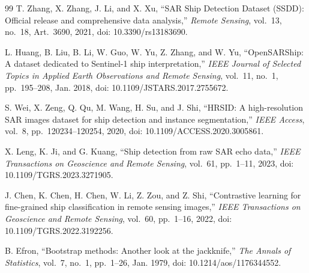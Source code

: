 \documentclass[journal]{IEEEtran}
\begin{document}
\begin{thebibliography}{99}
T. Zhang, X. Zhang, J. Li, and X. Xu, ``SAR Ship Detection Dataset (SSDD): Official release and comprehensive data analysis,'' \emph{Remote Sensing}, vol.~13, no.~18, Art.~3690, 2021, doi: 10.3390/rs13183690.

L. Huang, B. Liu, B. Li, W. Guo, W. Yu, Z. Zhang, and W. Yu, ``OpenSARShip: A dataset dedicated to Sentinel-1 ship interpretation,'' \emph{IEEE Journal of Selected Topics in Applied Earth Observations and Remote Sensing}, vol.~11, no.~1, pp.~195--208, Jan. 2018, doi: 10.1109/JSTARS.2017.2755672.

S. Wei, X. Zeng, Q. Qu, M. Wang, H. Su, and J. Shi, ``HRSID: A high-resolution SAR images dataset for ship detection and instance segmentation,'' \emph{IEEE Access}, vol.~8, pp.~120234--120254, 2020, doi: 10.1109/ACCESS.2020.3005861.

X. Leng, K. Ji, and G. Kuang, ``Ship detection from raw SAR echo data,'' \emph{IEEE Transactions on Geoscience and Remote Sensing}, vol.~61, pp.~1--11, 2023, doi: 10.1109/TGRS.2023.3271905.

J. Chen, K. Chen, H. Chen, W. Li, Z. Zou, and Z. Shi, ``Contrastive learning for fine-grained ship classification in remote sensing images,'' \emph{IEEE Transactions on Geoscience and Remote Sensing}, vol.~60, pp.~1--16, 2022, doi: 10.1109/TGRS.2022.3192256.

B. Efron, ``Bootstrap methods: Another look at the jackknife,'' \emph{The Annals of Statistics}, vol.~7, no.~1, pp.~1--26, Jan. 1979, doi: 10.1214/aos/1176344552.

\end{thebibliography}
\end{document}
